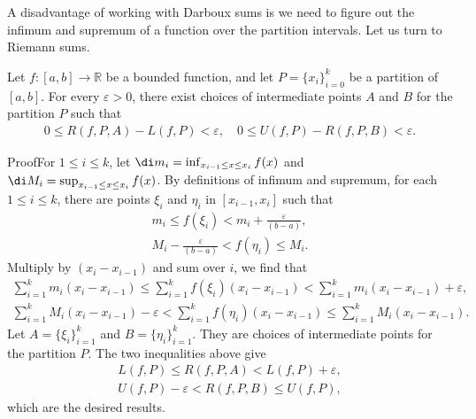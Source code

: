 A disadvantage of working with Darboux sums is we need to figure out the infimum and supremum of a function over the partition intervals. Let us turn to Riemann sums.

\begin{lemma}[label=230221_3]{}
Let $f:[a,b]\to\mathbb{R}$ be a bounded function, and let $P=\{x_i\}_{i=0}^k$ be a partition of $[a,b]$.
 For every  $\varepsilon>0$, there exist   choices of intermediate points $A$ and  $B$ for the partition $P$ such that
\begin{align*}
0\leq R(f,P,A)-L(f,P)<\varepsilon,\quad
 0\leq U(f, P)- R(f,P,B) <\varepsilon.\end{align*}
 
\end{lemma}
\begin{myproof}{Proof}For $1\leq i\leq k$, let
$\di m_i=\inf_{x_{i-1}\leq x\leq x_i}f(x)$ and $\di M_i=\sup_{x_{i-1}\leq x\leq x_i}f(x)$.
By definitions of infimum and supremum, for each $1\leq i\leq k$, there are points $\xi_i$ and $\eta_i$ in $[x_{i-1}, x_i]$ such that
\begin{gather*}
m_i\leq f(\xi_i)<m_i+\frac{\varepsilon}{ (b-a)},\\  M_i-\frac{\varepsilon}{ (b-a)}<f(\eta_i)\leq M_i.\end{gather*}
Multiply  by $(x_i-x_{i-1})$ and sum  over $i$, we find that
\begin{equation*} \begin{split}
\sum_{i=1}^km_i(x_i-x_{i-1})\leq \sum_{i=1}^kf(\xi_i)(x_i-x_{i-1}) <\sum_{i=1}^km_i(x_i-x_{i-1})+ \varepsilon,\\
\sum_{i=1}^kM_i(x_i-x_{i-1})- \varepsilon<\sum_{i=1}^kf(\eta_i)(x_i-x_{i-1})\leq  \sum_{i=1}^kM_i(x_i-x_{i-1}).
\end{split}\end{equation*}
Let $A=\{\xi_i\}_{i=1}^k$ and  $B=\{\eta_i\}_{i=1}^k$. They are choices of intermediate points for the partition $P$.  The two inequalities above give
\begin{gather*}
L(f,P)\leq R(f,P,A)<L(f,P)+\varepsilon,\\ U(f,P)-\varepsilon<R(f,P,B)\leq U(f,P),\end{gather*}which are the desired results.
\end{myproof}

